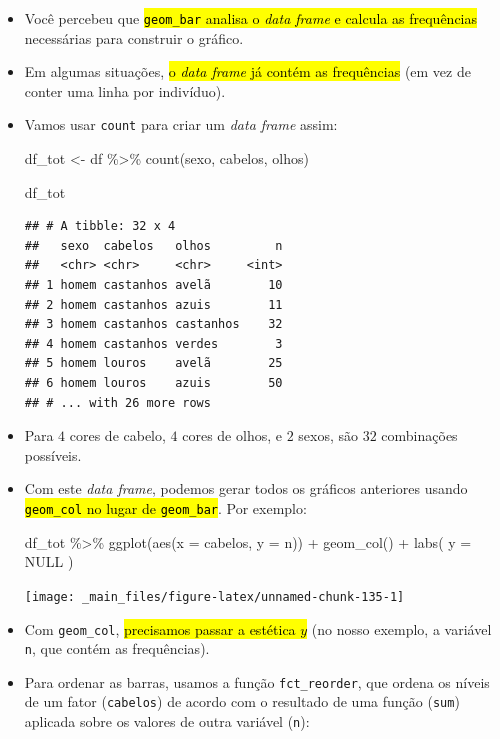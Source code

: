 \documentclass[
  11pt]{report}
\newenvironment{Shaded}{\begin{snugshade}}{\end{snugshade}}
\newcommand{\AttributeTok}[1]{\textcolor[rgb]{0.77,0.63,0.00}{#1}}
\newcommand{\ConstantTok}[1]{\textcolor[rgb]{0.00,0.00,0.00}{#1}}
\newcommand{\FunctionTok}[1]{\textcolor[rgb]{0.00,0.00,0.00}{#1}}
\newcommand{\NormalTok}[1]{#1}
\newcommand{\OtherTok}[1]{\textcolor[rgb]{0.56,0.35,0.01}{#1}}
\newcommand{\SpecialCharTok}[1]{\textcolor[rgb]{0.00,0.00,0.00}{#1}}
\renewenvironment{Shaded}{
    \begin{mdframed}[%
      roundcorner=2pt,%
      innerleftmargin=5pt,%
      innerrightmargin=5pt,%
      topline=true,%
      leftline=true,%
      rightline=true,%
      bottomline=true,%
      linewidth=0.5pt,%
      linecolor=black!20,%
      backgroundcolor=black!2,%
      skipabove=2ex,%
      skipbelow=2.5ex%
    ]%
  }
  {
    \end{mdframed}
  }
\begin{document}
\begin{itemize}
\item
  Você percebeu que {\hl{{\mbox{\texttt{geom\_bar}}} analisa o \emph{data frame} e calcula as frequências}} necessárias para construir o gráfico.
\item
  Em algumas situações, {\hl{o \emph{data frame} já contém as frequências}} (em vez de conter uma linha por indivíduo).
\item
  Vamos usar \texttt{count} para criar um \emph{data frame} assim:

\begin{Shaded}
\begin{Highlighting}[]
\NormalTok{df\_tot }\OtherTok{\textless{}{-}}\NormalTok{ df }\SpecialCharTok{\%\textgreater{}\%} 
  \FunctionTok{count}\NormalTok{(sexo, cabelos, olhos)}

\NormalTok{df\_tot}
\end{Highlighting}
\end{Shaded}

\begin{verbatim}
## # A tibble: 32 x 4
##   sexo  cabelos   olhos         n
##   <chr> <chr>     <chr>     <int>
## 1 homem castanhos avelã        10
## 2 homem castanhos azuis        11
## 3 homem castanhos castanhos    32
## 4 homem castanhos verdes        3
## 5 homem louros    avelã        25
## 6 homem louros    azuis        50
## # ... with 26 more rows
\end{verbatim}
\item
  Para $4$ cores de cabelo, $4$ cores de olhos, e $2$ sexos, são $32$ combinações possíveis.
\item
  Com este \emph{data frame}, podemos gerar todos os gráficos anteriores usando {\hl{{\mbox{\texttt{geom\_col}}} no lugar de {\mbox{\texttt{geom\_bar}}}}}. Por exemplo:

\begin{Shaded}
\begin{Highlighting}[]
\NormalTok{df\_tot }\SpecialCharTok{\%\textgreater{}\%} 
  \FunctionTok{ggplot}\NormalTok{(}\FunctionTok{aes}\NormalTok{(}\AttributeTok{x =}\NormalTok{ cabelos, }\AttributeTok{y =}\NormalTok{ n)) }\SpecialCharTok{+}
    \FunctionTok{geom\_col}\NormalTok{() }\SpecialCharTok{+}
    \FunctionTok{labs}\NormalTok{(}
      \AttributeTok{y =} \ConstantTok{NULL}
\NormalTok{    )}
\end{Highlighting}
\end{Shaded}

  \begin{center}\texttt{[image: \_main\_files/figure-latex/unnamed-chunk-135-1]} \end{center}
\item
  Com \texttt{geom\_col}, {\hl{precisamos passar a estética $y$}} (no nosso exemplo, a variável \texttt{n}, que contém as frequências).
\item
  Para ordenar as barras, usamos a função \texttt{fct\_reorder}, que ordena os níveis de um fator (\texttt{cabelos}) de acordo com o resultado de uma função (\texttt{sum}) aplicada sobre os valores de outra variável (\texttt{n}):


\end{itemize}
\end{document}
